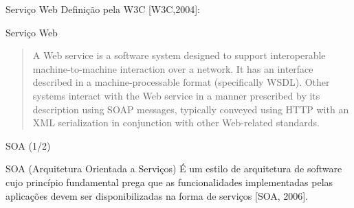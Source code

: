 \documentclass[xcolor=svgnames]{beamer}
\begin{document}
    \begin{frame}{Serviço Web}
    	Definição pela W3C [W3C,2004]: %
    	\begin{block}{Serviço Web}\vspace{-.3\baselineskip}
        	 \begin{quote}
                 A Web service is a software system designed to support interoperable machine-to-machine interaction over a network. It has an
 interface described in a machine-processable format (specifically WSDL). Other systems interact with the Web service in a manner
prescribed by its description using SOAP messages, typically conveyed using HTTP with an XML serialization in conjunction with other Web-related standards.
        	 \end{quote}
    	\end{block}
     \tiny{
      }
    \end{frame}

    \begin{frame}{SOA (1/2)}
            \begin{block}{SOA (Arquitetura Orientada a Serviços)}\vspace{-.3\baselineskip}
            É um estilo de arquitetura de software cujo princípio fundamental prega que as funcionalidades implementadas pelas
	    aplicações devem ser disponibilizadas na forma de serviços [SOA, 2006]. %
            \end{block}

            \tiny{
            }
    \end{frame}
\end{document}
